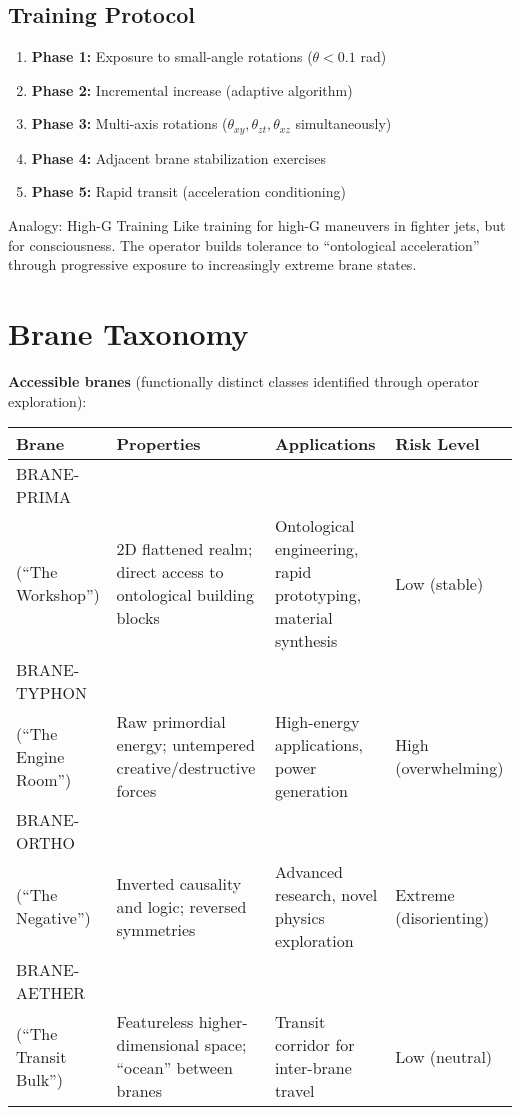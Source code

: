 \subsection{Training Protocol}
\label{subsec:training}

\begin{enumerate}
\item \textbf{Phase 1:} Exposure to small-angle rotations ($\theta < 0.1$ rad)
\item \textbf{Phase 2:} Incremental increase (adaptive algorithm)
\item \textbf{Phase 3:} Multi-axis rotations ($\theta_{xy}, \theta_{zt}, \theta_{xz}$ simultaneously)
\item \textbf{Phase 4:} Adjacent brane stabilization exercises
\item \textbf{Phase 5:} Rapid transit (acceleration conditioning)
\end{enumerate}

\begin{calloutbox}{Analogy: High-G Training}
Like training for high-G maneuvers in fighter jets, but for consciousness. The operator builds tolerance to ``ontological acceleration'' through progressive exposure to increasingly extreme brane states.
\end{calloutbox}

\section{Brane Taxonomy}
\label{sec:brane-taxonomy}

\textbf{Accessible branes} (functionally distinct classes identified through operator exploration):

\begin{center}
\begin{tabular}{@{}p{2.8cm}p{2.5cm}p{3.5cm}p{2cm}@{}}
\toprule
\textbf{Brane} & \textbf{Properties} & \textbf{Applications} & \textbf{Risk Level} \\
\midrule
BRANE-PRIMA\\(``The Workshop'') & 2D flattened realm; direct access to ontological building blocks & Ontological engineering, rapid prototyping, material synthesis & Low (stable) \\
\midrule
BRANE-TYPHON\\(``The Engine Room'') & Raw primordial energy; untempered creative/destructive forces & High-energy applications, power generation & High (overwhelming) \\
\midrule
BRANE-ORTHO\\(``The Negative'') & Inverted causality and logic; reversed symmetries & Advanced research, novel physics exploration & Extreme (disorienting) \\
\midrule
BRANE-AETHER\\(``The Transit Bulk'') & Featureless higher-dimensional space; ``ocean'' between branes & Transit corridor for inter-brane travel & Low (neutral) \\
\bottomrule
\end{tabular}
\end{center}

